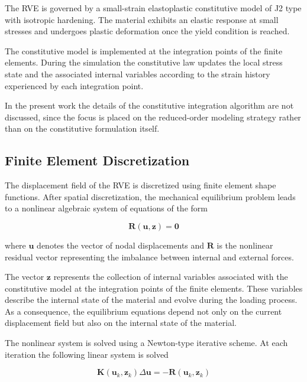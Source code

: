 \documentclass[11pt,a4paper]{article}
\begin{document}
The RVE is governed by a small-strain elastoplastic constitutive model of J2 type with isotropic hardening. The material exhibits an elastic response at small stresses and undergoes plastic deformation once the yield condition is reached.

The constitutive model is implemented at the integration points of the finite elements. During the simulation the constitutive law updates the local stress state and the associated internal variables according to the strain history experienced by each integration point.

In the present work the details of the constitutive integration algorithm are not discussed, since the focus is placed on the reduced-order modeling strategy rather than on the constitutive formulation itself.

\subsection{Finite Element Discretization}

The displacement field of the RVE is discretized using finite element shape functions. After spatial discretization, the mechanical equilibrium problem leads to a nonlinear algebraic system of equations of the form

\begin{equation}
\mathbf{R}(\mathbf{u},\mathbf{z}) = \mathbf{0}
\end{equation}

where $\mathbf{u}$ denotes the vector of nodal displacements and $\mathbf{R}$ is the nonlinear residual vector representing the imbalance between internal and external forces.

The vector $\mathbf{z}$ represents the collection of internal variables associated with the constitutive model at the integration points of the finite elements. These variables describe the internal state of the material and evolve during the loading process. As a consequence, the equilibrium equations depend not only on the current displacement field but also on the internal state of the material.

The nonlinear system is solved using a Newton-type iterative scheme. At each iteration the following linear system is solved

\begin{equation}
\mathbf{K}(\mathbf{u}_k,\mathbf{z}_k)\Delta \mathbf{u}
=
-\mathbf{R}(\mathbf{u}_k,\mathbf{z}_k)
\end{equation}
\end{document}
